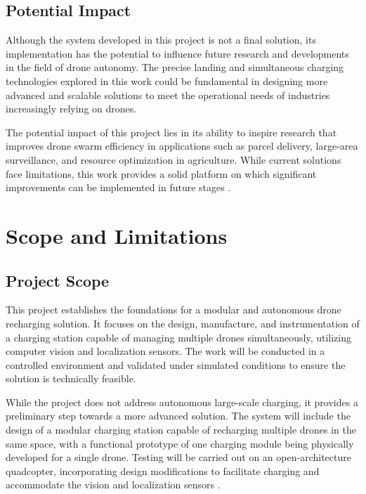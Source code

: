 \subsection{Potential Impact}

Although the system developed in this project is not a final solution, its implementation has the potential to influence future research and developments in the field of drone autonomy. The precise landing and simultaneous charging technologies explored in this work could be fundamental in designing more advanced and scalable solutions to meet the operational needs of industries increasingly relying on drones.

The potential impact of this project lies in its ability to inspire research that improves drone swarm efficiency in applications such as parcel delivery, large-area surveillance, and resource optimization in agriculture. While current solutions face limitations, this work provides a solid platform on which significant improvements can be implemented in future stages \cite{cite2}.

\section{Scope and Limitations}

\subsection{Project Scope}

This project establishes the foundations for a modular and autonomous drone recharging solution. It focuses on the design, manufacture, and instrumentation of a charging station capable of managing multiple drones simultaneously, utilizing computer vision and localization sensors. The work will be conducted in a controlled environment and validated under simulated conditions to ensure the solution is technically feasible.

While the project does not address autonomous large-scale charging, it provides a preliminary step towards a more advanced solution. The system will include the design of a modular charging station capable of recharging multiple drones in the same space, with a functional prototype of one charging module being physically developed for a single drone. Testing will be carried out on an open-architecture quadcopter, incorporating design modifications to facilitate charging and accommodate the vision and localization sensors \cite{cite3}.

